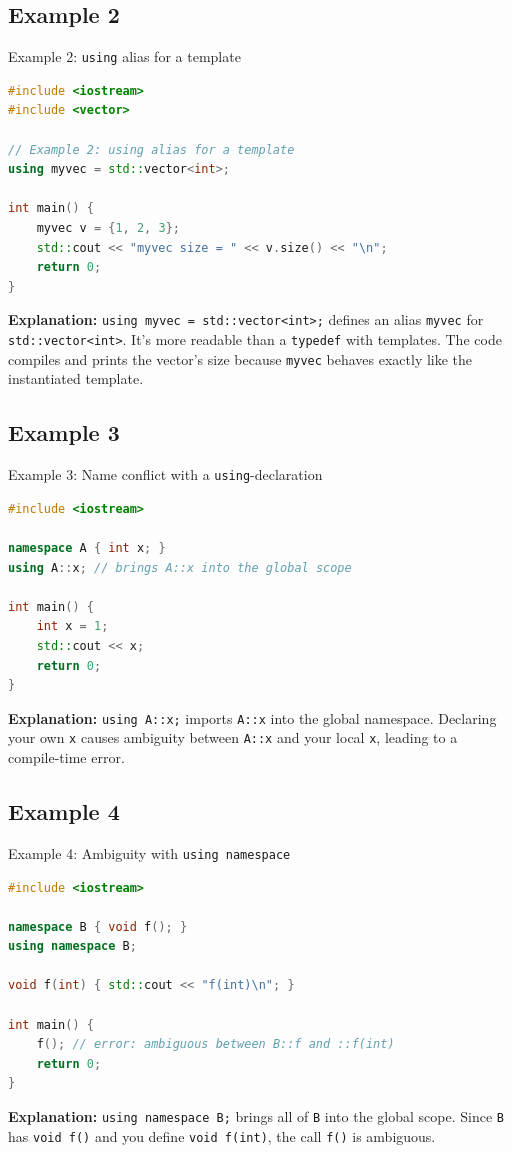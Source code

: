\documentclass{beamer}
\begin{document}
\subsection{Example 2}
\begin{frame}[fragile]{Example 2: \texttt{using} alias for a template}
\begin{lstlisting}[language=C++]
#include <iostream>
#include <vector>

// Example 2: using alias for a template
using myvec = std::vector<int>;

int main() {
    myvec v = {1, 2, 3};
    std::cout << "myvec size = " << v.size() << "\n";
    return 0;
}
\end{lstlisting}
\textbf{Explanation:}
\texttt{using myvec = std::vector<int>;} defines an alias \texttt{myvec} for \texttt{std::vector<int>}. It’s more readable than a \texttt{typedef} with templates. The code compiles and prints the vector’s size because \texttt{myvec} behaves exactly like the instantiated template.
\end{frame}
\subsection{Example 3}
\begin{frame}[fragile]{Example 3: Name conflict with a \texttt{using}-declaration}
\begin{lstlisting}[language=C++]
#include <iostream>

namespace A { int x; }
using A::x; // brings A::x into the global scope

int main() {
    int x = 1;
    std::cout << x;
    return 0;
}
\end{lstlisting}
\textbf{Explanation:}
\texttt{using A::x;} imports \texttt{A::x} into the global namespace. Declaring your own \texttt{x} causes ambiguity between \texttt{A::x} and your local \texttt{x}, leading to a compile-time error.
\end{frame}
\subsection{Example 4}
\begin{frame}[fragile]{Example 4: Ambiguity with \texttt{using namespace}}
\begin{lstlisting}[language=C++]
#include <iostream>

namespace B { void f(); }
using namespace B;

void f(int) { std::cout << "f(int)\n"; }

int main() {
    f(); // error: ambiguous between B::f and ::f(int)
    return 0;
}
\end{lstlisting}
\textbf{Explanation:}
\texttt{using namespace B;} brings all of \texttt{B} into the global scope. Since \texttt{B} has \texttt{void f()} and you define \texttt{void f(int)}, the call \texttt{f()} is ambiguous.
\end{frame}
\end{document}
